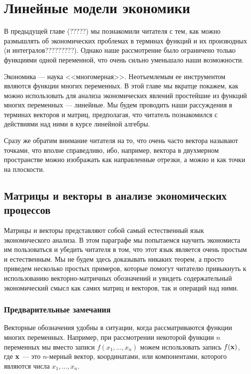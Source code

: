 \chapter{Линейные модели экономики}

В предыдущей главе (?????) мы познакомили читателя с тем, как можно размышлять об
экономических проблемах в терминах функций и их производных (и интегралов?????????). Однако
наше рассмотрение было ограничено только функциями одной переменной, что очень сильно
уменьшало наши возможности.



Экономика --- наука <<многомерная>>. Неотъемлемым ее инструментом
являются функции многих переменных. В этой главе мы вкратце покажем,
как можно использовать для анализа экономических явлений простейшие
из функций многих переменных --- линейные. Мы будем проводить наши
рассуждения в терминах векторов и матриц, предполагая, что читатель
познакомился с действиями над ними в курсе линейной алгебры.

Сразу же обратим внимание читателя на то, что очень часто вектора называют точками, что
вполне справедливо, ибо, например, вектора в двухмерном пространстве можно изображать как
направленные отрезки, а можно и как точки на плоскости.



\section{Матрицы и векторы в анализе экономических процессов}

    Матрицы и векторы представляют собой самый естественный язык
    экономического анализа. В этом параграфе мы попытаемся
    научить экономиста им пользоваться и убедить читателя в
    том, что этот язык является очень простым и естественным. Мы не
    будем здесь доказывать  никаких теорем, а просто приведем
    несколько простых примеров, которые помогут читателю привыкнуть
    к использованию векторно-матричных обозначений и увидеть
    содержательный экономический смысл как самих матриц и векторов,
    так и операций над ними.

\subsection{Предварительные замечания}

    Векторные обозначения удобны в
    ситуации, когда рассматриваются функции многих переменных.
    Например, при рассмотрении некоторой функции $n$ переменных
    мы вместо записи $f(x_{1},\ldots,x_{n})$ можем
    использовать запись $f(\mathbf{x})$, где $\mathbf{x}$ --- это $n$-мерный
    вектор, координатами, или компонентами, которого являются числа
    $x_{1},\ldots,x_{n}$.

